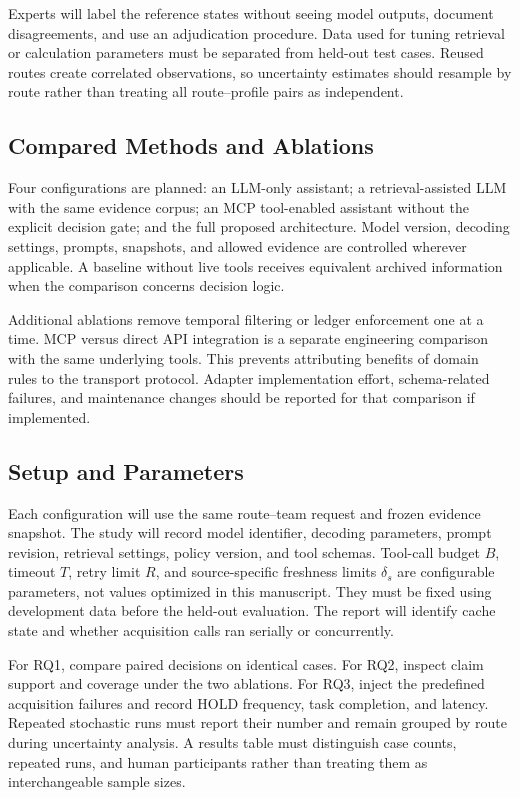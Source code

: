 \documentclass[conference]{IEEEtran}
\begin{document}
Experts will label the reference states without seeing model outputs, document disagreements, and use an adjudication procedure. Data used for tuning retrieval or calculation parameters must be separated from held-out test cases. Reused routes create correlated observations, so uncertainty estimates should resample by route rather than treating all route--profile pairs as independent.

\subsection{Compared Methods and Ablations}
Four configurations are planned: an LLM-only assistant; a retrieval-assisted LLM with the same evidence corpus; an MCP tool-enabled assistant without the explicit decision gate; and the full proposed architecture. Model version, decoding settings, prompts, snapshots, and allowed evidence are controlled wherever applicable. A baseline without live tools receives equivalent archived information when the comparison concerns decision logic.

Additional ablations remove temporal filtering or ledger enforcement one at a time. MCP versus direct API integration is a separate engineering comparison with the same underlying tools. This prevents attributing benefits of domain rules to the transport protocol. Adapter implementation effort, schema-related failures, and maintenance changes should be reported for that comparison if implemented.

\subsection{Setup and Parameters}
Each configuration will use the same route--team request and frozen evidence snapshot. The study will record model identifier, decoding parameters, prompt revision, retrieval settings, policy version, and tool schemas. Tool-call budget $B$, timeout $T$, retry limit $R$, and source-specific freshness limits $\delta_s$ are configurable parameters, not values optimized in this manuscript. They must be fixed using development data before the held-out evaluation. The report will identify cache state and whether acquisition calls ran serially or concurrently.

For RQ1, compare paired decisions on identical cases. For RQ2, inspect claim support and coverage under the two ablations. For RQ3, inject the predefined acquisition failures and record HOLD frequency, task completion, and latency. Repeated stochastic runs must report their number and remain grouped by route during uncertainty analysis. A results table must distinguish case counts, repeated runs, and human participants rather than treating them as interchangeable sample sizes.
\end{document}
